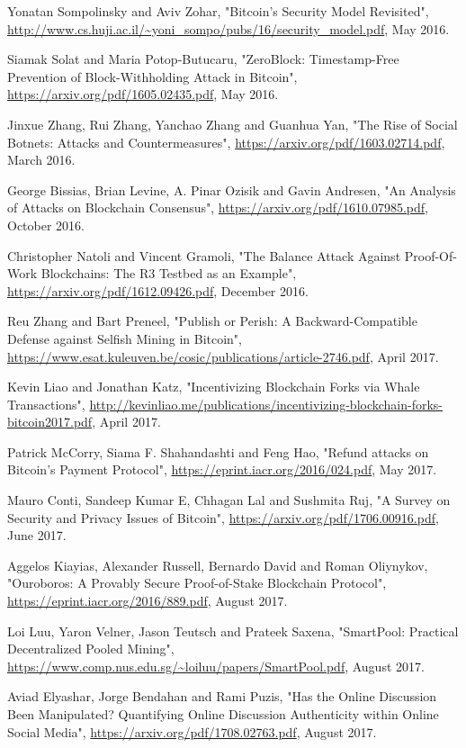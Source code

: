 \documentclass[12pt,a4paper]{article}
\begin{document}
\begin{thebibliography}{9}
Yonatan Sompolinsky and Aviv Zohar,
"Bitcoin's Security Model Revisited",
\url{http://www.cs.huji.ac.il/~yoni_sompo/pubs/16/security_model.pdf},
May 2016.

Siamak Solat and Maria Potop-Butucaru,
"ZeroBlock: Timestamp-Free Prevention of Block-Withholding Attack in Bitcoin",
\url{https://arxiv.org/pdf/1605.02435.pdf},
May 2016.

Jinxue Zhang, Rui Zhang, Yanchao Zhang and Guanhua Yan,
"The Rise of Social Botnets: Attacks and Countermeasures",
\url{https://arxiv.org/pdf/1603.02714.pdf},
March 2016.

George Bissias, Brian Levine, A. Pinar Ozisik and Gavin Andresen,
"An Analysis of Attacks on Blockchain Consensus",
\url{https://arxiv.org/pdf/1610.07985.pdf},
October 2016.

Christopher Natoli and Vincent Gramoli,
"The Balance Attack Against Proof-Of-Work Blockchains: The R3 Testbed as an Example",
\url{https://arxiv.org/pdf/1612.09426.pdf},
December 2016.

Reu Zhang and Bart Preneel,
"Publish or Perish: A Backward-Compatible Defense against Selfish Mining in Bitcoin",
\url{https://www.esat.kuleuven.be/cosic/publications/article-2746.pdf},
April 2017.

Kevin Liao and Jonathan Katz,
"Incentivizing Blockchain Forks via Whale Transactions",
\url{http://kevinliao.me/publications/incentivizing-blockchain-forks-bitcoin2017.pdf},
April 2017.

Patrick McCorry, Siama F. Shahandashti and Feng Hao,
"Refund attacks on Bitcoin's Payment Protocol",
\url{https://eprint.iacr.org/2016/024.pdf},
May 2017.

Mauro Conti, Sandeep Kumar E, Chhagan Lal and Sushmita Ruj,
"A Survey on Security and Privacy Issues of Bitcoin",
\url{https://arxiv.org/pdf/1706.00916.pdf},
June 2017.

Aggelos Kiayias, Alexander Russell, Bernardo David and Roman Oliynykov,
"Ouroboros: A Provably Secure Proof-of-Stake Blockchain Protocol",
\url{https://eprint.iacr.org/2016/889.pdf},
August 2017.

Loi Luu, Yaron Velner, Jason Teutsch and Prateek Saxena,
"SmartPool: Practical Decentralized Pooled Mining",
\url{https://www.comp.nus.edu.sg/~loiluu/papers/SmartPool.pdf},
August 2017.

Aviad Elyashar, Jorge Bendahan and Rami Puzis,
"Has the Online Discussion Been Manipulated? Quantifying Online Discussion Authenticity within Online Social Media",
\url{https://arxiv.org/pdf/1708.02763.pdf},
August 2017.


\end{thebibliography}
\end{document}
